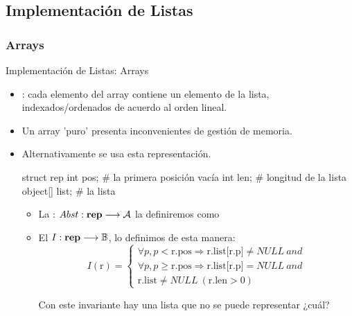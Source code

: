 \documentclass[10pt,envcountsect,spanish]{beamer}
\begin{document}
\subsection{Implementación de Listas}


\subsubsection{Arrays}

\begin{frame}[fragile]{Implementación de Listas: Arrays}

\begin{itemize}
\item {}: cada elemento del array contiene un elemento de la lista, indexados/ordenados de acuerdo al orden lineal.

\item Un array 'puro' presenta inconvenientes de gestión de memoria.
\item Alternativamente se usa esta representación.

\begin{pyverbatim}
struct rep
   int pos; # la primera posición vacía
   int len; # longitud de la lista
   object[] list;  # la lista
\end{pyverbatim}


\begin{itemize}
\item La :
$
Abst: \mbox{\textbf{rep}} \longrightarrow {\cal A}
$
la definiremos como

\centerline{}

\item El  
$I: \mbox{\textbf{rep}} \longrightarrow \mathbb{B}$,  lo definimos de esta manera:
$$I( \text{r} ) =
\left\{
\begin{array}{l}
\forall p, p < \text{r.pos} \Rightarrow \text{r.list[r.p]} \not= NULL\ and \\
\forall p, p \geq \text{r.pos} \Rightarrow \text{r.list[r.p]} = NULL \ and \\
\text{r.list} \not= NULL \ (\text{r.len} > 0)
\end{array}
\right.
$$


Con este invariante hay una lista que no se puede representar ¿cuál?

\end{itemize}

\end{itemize}

\end{frame}
\end{document}
